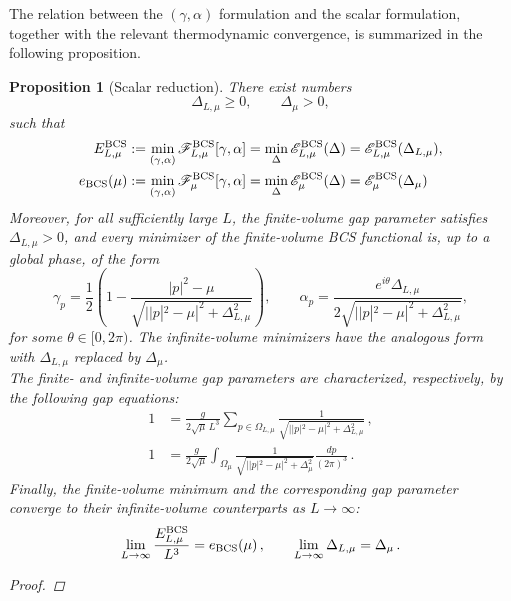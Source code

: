\documentclass[11pt]{amsart}
\newtheorem{proposition}[definition]{Proposition}
\theoremstyle{definition}
\numberwithin{equation}{section}
\newcommand{\1}{\mathbf 1}
\begin{document}
The relation between the $(\gamma,\alpha)$ formulation and the scalar formulation, together with the relevant thermodynamic convergence, is summarized in the following proposition.
\begin{proposition}[Scalar reduction]
\label{prop:scalar-reduction}
There exist numbers
\[
 \Delta_{L,\mu}\geq0,
 \qquad
 \Delta_\mu>0,
\]
such that
\begin{align}
 E^{\rm BCS}_{L,\mu}
 &:=
 \min_{(\gamma,\alpha)}
 \mathscr F^{\rm BCS}_{L,\mu}[\gamma,\alpha]
 =
 \min_{\Delta} \mathscr E^{\rm BCS}_{L,\mu}(\Delta) = \mathscr E^{\rm BCS}_{L,\mu}(\Delta_{L, \mu}),
 \label{eq:scalar-reduction-finite}
 \\
 e_{\rm BCS}(\mu)
 &:=
 \min_{(\gamma,\alpha)}
 \mathscr F^{\rm BCS}_{\mu}[\gamma,\alpha]
 =
 \min_{\Delta} \mathscr E^{\rm BCS}_{\mu}(\Delta) = \mathscr E^{\rm BCS}_{\mu}(\Delta_{\mu})
 \label{eq:scalar-reduction-infinite}
\end{align}
Moreover, for all sufficiently large $L$, the finite-volume gap parameter satisfies $\Delta_{L,\mu}>0$, and every minimizer of the finite-volume BCS functional is, up to a global phase, of the form 
\begin{equation}\label{eq:form-finite-minimizers}
    \gamma_p = \frac{1}{2}\left(
 1-\frac{|p|^2 - \mu}
 {\sqrt{||p|^2 - \mu|^2+\Delta_{L,\mu}^2}}
 \right),
 \qquad
 \alpha_p
 =
 \frac{e^{i\theta}\Delta_{L,\mu}}
 {2\sqrt{||p|^2 - \mu|^2+\Delta_{L,\mu}^2}},
\end{equation}
for some $\theta \in [0,2\pi)$. The infinite-volume minimizers have the analogous form with $\Delta_{L,\mu}$ replaced by $\Delta_\mu$.\\
The finite- and infinite-volume gap parameters are characterized, respectively, by the following gap equations:
\begin{align}
  1 &=
 \frac{g}{2\sqrt\mu\,L^3}
 \sum_{p\in\Omega_{L,\mu}}
 \frac1{\sqrt{||p|^2 - \mu|^2+\Delta_{L,\mu}^2}}\,, \\
  1 &=
 \frac{g}{2\sqrt\mu}
 \int_{\Omega_\mu}
 \frac1{\sqrt{||p|^2-\mu|^2+\Delta_\mu^2}}\frac{dp}{(2\pi)^3}\,.
\end{align}
Finally, the finite-volume minimum and the corresponding gap parameter converge to their infinite-volume counterparts as $L\to\infty$:
\begin{equation}
     \lim_{L \to \infty}\frac{E^{\rm BCS}_{L, \mu}}{L^3} = e_{\rm BCS}(\mu)\,, \qquad \lim_{L \to \infty}\Delta_{L, \mu} = \Delta_{\mu}\,.
\end{equation}
\begin{proof}

\end{proof}
\end{proposition}
\end{document}
